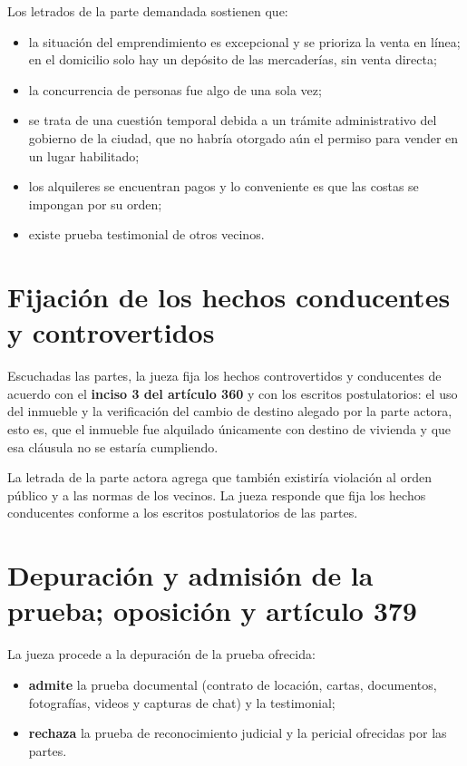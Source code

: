 \documentclass[12pt,oneside]{book}
\begin{document}
Los letrados de la parte demandada sostienen que:

\begin{itemize}
    \item la situación del emprendimiento es excepcional y se prioriza la venta en línea; en el domicilio solo hay un depósito de las mercaderías, sin venta directa;
    \item la concurrencia de personas fue algo de una sola vez;
    \item se trata de una cuestión temporal debida a un trámite administrativo del gobierno de la ciudad, que no habría otorgado aún el permiso para vender en un lugar habilitado;
    \item los alquileres se encuentran pagos y lo conveniente es que las costas se impongan por su orden;
    \item existe prueba testimonial de otros vecinos.
\end{itemize}

\section{Fijación de los hechos conducentes y controvertidos}

Escuchadas las partes, la jueza fija los hechos controvertidos y conducentes de acuerdo con el \textbf{inciso 3 del artículo 360} y con los escritos postulatorios: el uso del inmueble y la verificación del cambio de destino alegado por la parte actora, esto es, que el inmueble fue alquilado únicamente con destino de vivienda y que esa cláusula no se estaría cumpliendo.

La letrada de la parte actora agrega que también existiría violación al orden público y a las normas de los vecinos. La jueza responde que fija los hechos conducentes conforme a los escritos postulatorios de las partes.

\section{Depuración y admisión de la prueba; oposición y artículo 379}

La jueza procede a la depuración de la prueba ofrecida:

\begin{itemize}
    \item \textbf{admite} la prueba documental (contrato de locación, cartas, documentos, fotografías, videos y capturas de chat) y la testimonial;
    \item \textbf{rechaza} la prueba de reconocimiento judicial y la pericial ofrecidas por las partes.
\end{itemize}
\end{document}
